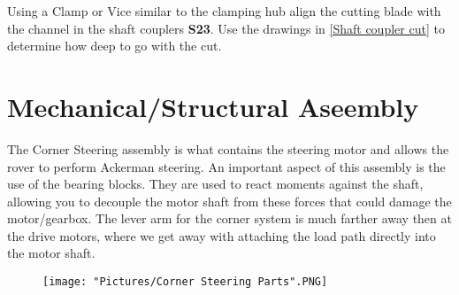 \documentclass[12pt]{article}
\begin{document}
Using a Clamp or Vice similar to the clamping hub align the cutting blade with the channel in the shaft couplers \textbf{S23}. Use the drawings in \ref{Shaft coupler cut} to determine how deep to go with the cut.


\section{Mechanical/Structural Aseembly} 
The Corner Steering assembly is what contains the steering motor and allows the rover to perform Ackerman steering. An important aspect of this assembly is the use of the bearing blocks. They are used to react moments against the shaft, allowing you to decouple the motor shaft from these forces that could damage the motor/gearbox. The lever arm for the corner system is much farther away then at the drive motors, where we get away with attaching the load path directly into the motor shaft.

\begin{figure}[H]
	\centering
	\texttt{[image: "Pictures/Corner Steering Parts".PNG]}
\end{figure}
\end{document}
